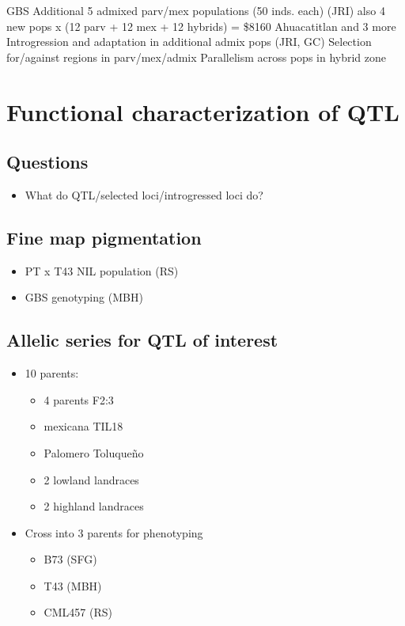 GBS Additional 5 admixed parv/mex populations (50 inds. each) (JRI)
also 4 new pops x (12 parv + 12 mex + 12 hybrids) = \$8160
Ahuacatitlan and 3 more
Introgression and adaptation in additional admix pops (JRI, GC)
Selection for/against regions in parv/mex/admix
Parallelism across pops in hybrid zone

\section{Functional characterization of QTL} \label{sec:funchar}

\subsection{Questions}
\begin{itemize}
\item What do QTL/selected loci/introgressed loci do?
\end{itemize}

\subsection{Fine map pigmentation} \label{subsec:pigment}
\begin{itemize}
\item PT x T43 NIL population (RS)
\item GBS genotyping (MBH)
\end{itemize}

\subsection{Allelic series for QTL of interest} \label{subsec:series}
\begin{itemize}
\item 10 parents:
\begin{itemize}
\item 4 parents F2:3
\item mexicana TIL18
\item Palomero Toluqueño
\item 2 lowland landraces
\item 2 highland landraces
\end{itemize}
\item Cross into 3 parents for phenotyping
\begin{itemize}
\item B73 (SFG)
\item T43 (MBH)
\item CML457 (RS)
\end{itemize}
\end{itemize}

